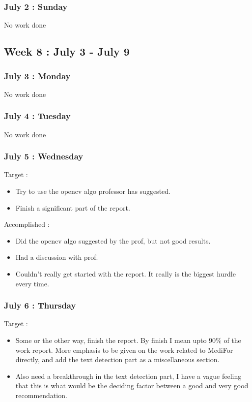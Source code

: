 \documentclass{article}
\begin{document}
\subsubsection{July 2 : Sunday}
No work done

\subsection{Week 8 : July 3 - July 9}
\subsubsection{July 3 : Monday}
No work done

\subsubsection{July 4 : Tuesday}
No work done

\subsubsection{July 5 : Wednesday}
Target :
\begin{itemize}
\item Try to use the opencv algo professor has suggested.
\item Finish a significant part of the report.
\end{itemize}

Accomplished :
\begin{itemize}
\item Did the opencv algo suggested by the prof, but not good results.
\item Had a discussion with prof.
\item Couldn't really get started with the report. It really is the biggest hurdle every time.
\end{itemize}

\subsubsection{July 6 : Thursday}
Target :
\begin{itemize}
\item Some or the other way, finish the report. By finish I mean upto 90\% of the work report. More emphasis to be given on the work related to MediFor directly, and add the text detection part as a miscellaneous section.
\item Also need a breakthrough in the text detection part, I have a vague feeling that this is what would be the deciding factor between a good and very good recommendation.
\end{itemize}
\end{document}

